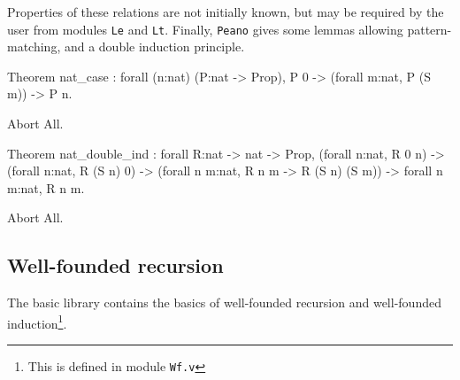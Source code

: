 Properties of these relations are not initially known, but may be
required by the user from modules \verb:Le: and \verb:Lt:.  Finally,
\verb:Peano: gives some lemmas allowing pattern-matching, and a double
induction principle.


\begin{coq_example*}
Theorem nat_case :
 forall (n:nat) (P:nat -> Prop), 
 P 0 -> (forall m:nat, P (S m)) -> P n.
\end{coq_example*}
\begin{coq_eval}
Abort All.
\end{coq_eval}
\begin{coq_example*}
Theorem nat_double_ind :
 forall R:nat -> nat -> Prop,
   (forall n:nat, R 0 n) ->
   (forall n:nat, R (S n) 0) ->
   (forall n m:nat, R n m -> R (S n) (S m)) -> forall n m:nat, R n m.
\end{coq_example*}
\begin{coq_eval}
Abort All.
\end{coq_eval}

\subsection{Well-founded recursion}

The basic library contains the basics of well-founded recursion and 
well-founded induction\footnote{This is defined in module {\tt Wf.v}}.

